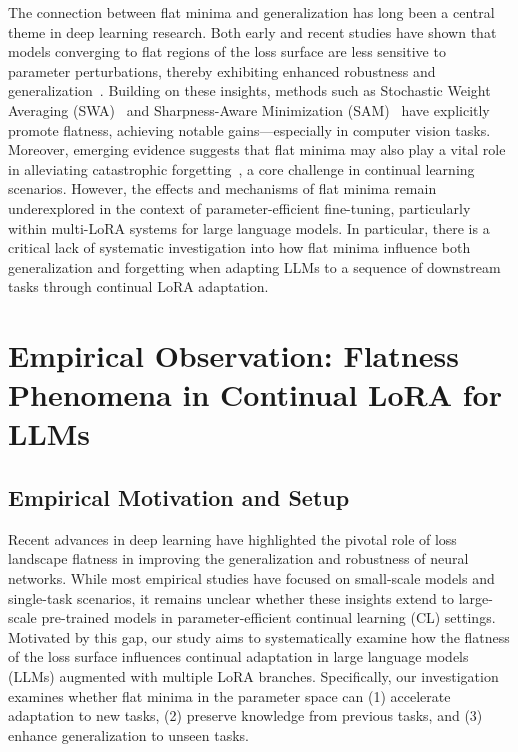 \documentclass[letterpaper]{article} %
\begin{document}
The connection between flat minima and generalization has long been a central theme in deep learning research. Both early and recent studies have shown that models converging to flat regions of the loss surface are less sensitive to parameter perturbations, thereby exhibiting enhanced robustness and generalization~. Building on these insights, methods such as Stochastic Weight Averaging (SWA)~ and Sharpness-Aware Minimization (SAM)~ have explicitly promote flatness, achieving notable gains—especially in computer vision tasks. Moreover, emerging evidence suggests that flat minima may also play a vital role in alleviating catastrophic forgetting~\cite{mirzadehUnderstandingRoleTraining2020,JMLRAnEmpiricalInvestigatio}, a core challenge in continual learning scenarios. However, the effects and mechanisms of flat minima remain underexplored in the context of parameter-efficient fine-tuning, particularly within multi-LoRA systems for large language models. In particular, there is a critical lack of systematic investigation into how flat minima influence both generalization and forgetting when adapting LLMs to a sequence of downstream tasks through continual LoRA adaptation.




\section{Empirical Observation: Flatness Phenomena in Continual LoRA for LLMs}


\subsection{Empirical Motivation and Setup}

Recent advances in deep learning have highlighted the pivotal role of loss landscape flatness in improving the generalization and robustness of neural networks. While most empirical studies have focused on small-scale models and single-task scenarios, it remains unclear whether these insights extend to large-scale pre-trained models in parameter-efficient continual learning (CL) settings. Motivated by this gap, our study aims to systematically examine how the flatness of the loss surface influences continual adaptation in large language models (LLMs) augmented with multiple LoRA branches. Specifically,  our investigation examines whether flat minima in the parameter space can (1) accelerate adaptation to new tasks, (2) preserve knowledge from previous tasks, and (3) enhance generalization to unseen tasks.
\end{document}
